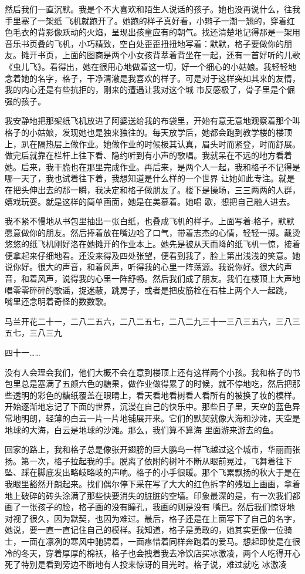 \documentclass{article}
\begin{document}
然后我们一直沉默。我是个不大喜欢和陌生人说话的孩子。她也没再说什么，往我手里塞了一架纸
\newpage
飞机就跑开了。她跑的样子真好看，小辫子一潮一翘的，穿着红色毛衣的背影像跃动的火焰，呈现出孩童应有的朝气。找还清楚地记得那是一架用音乐书页叠的飞机，小巧精致，空白处歪歪扭扭地写着：默默，格子要做你的朋友。摊开书页，上面的图商是两个小女孩背萃着背坐在一起，还有一首好听的儿歌《虫儿飞》。看得出，她在很用心地做着这一切，好一个细心的小姑娘。我轻轻地念着她的名字，格子，干净清澈是我喜欢的样子。可是对于这样突如其来的友情，我的内心还是有些抗拒的，刚来的遭遇让我对这个城
市反感极了，骨子里是个倔强的孩子。 

我安静地把那架纸飞机放进了阿婆送给我的布袋里，开始有意无意地观察着那个叫格子的小姑娘，发现她也是独来独往的。每天放学后，她都会跑到教学楼的楼顶上，趴在隔热层上做作业。她做作业的时候极其认真，眉头时而紧登，时而舒展。做完后就靠在栏杆上往下看、隐约听到有小声的歌唱。我就呆在不远的地方看着她。后来，我干脆也在那里完成作业。再后来，是两个人一起，我和格子不记得是哪一天了，我也试着往下着，我想知道是什么样的一个世界
\newpage
让她如此专注。就是在把头伸出去的那一瞬，我决定和格子做朋友了。楼下是操场，三三两两的人群，嬉戏玩耍。就是这样的简单画面，她是在美慕着。她唱
歌，想把自己融人进去。 

我不紧不慢地从书包里抽出一张白纸，也叠成飞机的样子。上面写着:格子，默默愿意做你的朋友。然后捧着放在嘴边哈了口气，带着志杰的心情，轻轻一掷。戴烫悠悠的纸飞机刚好洛在她摊开的作业本上。她先是被从天而降的纸飞机一惊，接着便拿起来仔细地看。还没来得及四处张望，便看到我了，脸上第出浅浅的笑意。她说你好。很大的声音，和着风声，听得我的心里一阵荡源。我说你好。很大的声音，和着风声，说得我的心里一阵舒畅。然后我们成了朋友。我们在楼顶上大声地唱零零碎碎的歌谣，捉迷蔽，跳房子，或者是把皮筋栓在石柱上两个人一起跳，
嘴里还念明着奇怪的数数歌。 

马兰开花二十一，二八二五六，二八二五七，二八二九三十一三八三五六，三八三五七，三八三九

\newpage
四十一…… 

没有人会理会我们，他们大概不会在意到楼顶上还有这样两个小孩。我和格子的书包里总是塞满了五颜六色的糖果，做作业做得累了的时候，就不停地吃，然后把那些透明的彩色的糖纸覆盖在眼睛上，看天看地看树看人看所有的被换了妆的模样。开始逐渐地忘记了下面的世界，沉漫在自己的快乐中。那些日子里，天空的蓝色异常地明朗，轻薄的白云一片一片地铺展开来。它们的默契就像大海和沙滩，天空是地球的大海，白云是地球的沙滩。那么，我们算不算海
里面游来游去的鱼。 

回家的路上，我和格子总是像张开翅膀的巨大鹏鸟一样飞越过这个城市，华丽而张扬。第一次，格子拉起我的手。脱离了依附的树叶不断从眼前晃过，飞舞着往下坠、踩在脚底发出略岐略岐的声响。格子的小手很暖。那个飞累飘扬的秋大于是在我眼里豁然开朗起来。找们偶尔停下采在写了大大的红色拆字的残垣上画画，拿着地上破碎的砖头涂满了那些快要消失的脏脏的空墙。印象最深的是，有一次我们都画了一张孩子的脸，格子画的没有瞳孔，我画的则是没有
\newpage
嘴巴。然后我们惊讶地对视了很久，因为默契，也因为难过。最后，格子还是在上面写下了自己的名字，她说，要一直一直记住自己的模样。我知道，格子是勇敢的，她其实更像一位骑士，一面在凛冽的寒风中驰骋着，一面疼惜着同样奔跑着的爱马。想起即使是在很冷的冬天，穿着厚厚的棉袄，格子也会拽着我去冷饮店买冰激凌，两个人吃得开心死了特别是看到旁边不断地有人投来惊讶的目光时。格子说，难过就吃
冰激凌 
\end{document}
